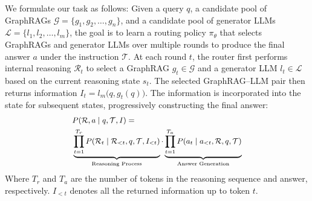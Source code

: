 We formulate our task as follows: Given a query \(q\), a candidate pool of GraphRAGs
\(\mathcal{G}=\{g_1,g_2,\dots,g_n\}\),
and a candidate pool of generator LLMs
\(\mathcal{L}=\{l_1,l_2,\dots,l_m\}\),
the goal is to learn a routing policy \(\pi_{\theta}\) that selects GraphRAGs and generator LLMs over multiple rounds to produce the final answer \(a\) under the instruction \(\mathcal{T}\).
At each round \(t\), the router first performs internal reasoning \(\mathcal{R}_t\) to select a GraphRAG \(g_t \in \mathcal{G}\) and a generator LLM \(l_t \in \mathcal{L}\) based on the current reasoning state \(s_t\). The selected GraphRAG--LLM pair then returns information $I_t = l_m\bigr(q, g_t(q)\bigl)$. 
The information is incorporated into the state for subsequent states, progressively constructing the final answer:
\[
\small
\begin{aligned}
& P(\mathcal{R}, a \mid q, \mathcal{T}, I)= \\
&\underbrace{\prod_{t=1}^{T_r}
P(\mathcal{R}_t \mid \mathcal{R}_{<t}, q, \mathcal{T},I_{<t})}_{\text{Reasoning Process}}
\cdot \underbrace{\prod_{t=1}^{T_a}
P(a_t \mid a_{<t}, \mathcal{R}, q, \mathcal{T})}_{\text{Answer Generation}}
\end{aligned}
\]
Where $T_r$ and $T_a$ are the number of tokens in the reasoning sequence and answer, respectively. $I_{<t}$ denotes all the returned information up to token $t$.




